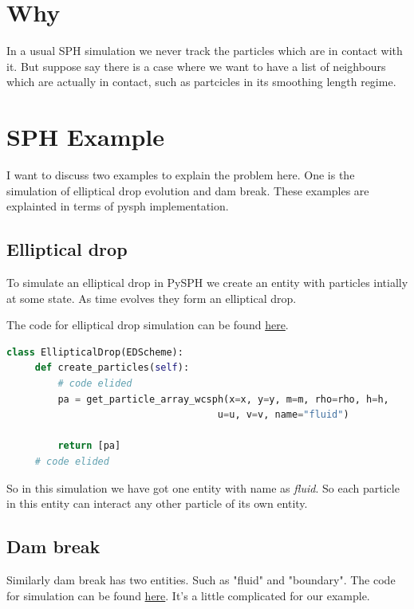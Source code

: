


\section{Why}
\label{sec-1}
In a usual SPH simulation we never track the particles which are in contact
with it.  But suppose say there is a case where we want to have a list of
neighbours which are actually in contact, such as partcicles in its smoothing
length regime.


\section{SPH Example}
\label{sec-2}
I want to discuss two examples to explain the problem here. One is the
simulation of elliptical drop evolution and dam break. These
examples are explainted in terms of pysph implementation.


\subsection{Elliptical drop}
\label{sec-2-1}
To simulate an elliptical drop in PySPH we create an entity with particles
intially at some state. As time evolves they form an elliptical drop.

The code for elliptical drop simulation can be found \href{https://github.com/pypr/pysph/blob/master/pysph/examples/elliptical_drop_no_scheme.py}{here}.

\begin{lstlisting}[language=Python]
 class EllipticalDrop(EDScheme):
     def create_particles(self):
         # code elided
         pa = get_particle_array_wcsph(x=x, y=y, m=m, rho=rho, h=h,
                                     u=u, v=v, name="fluid")

         return [pa]
     # code elided
\end{lstlisting}

So in this simulation we have got one entity with name as \emph{fluid}. So each particle
in this entity can interact any other particle of its own entity.

\subsection{Dam break}
\label{sec-2-2}
Similarly dam break has two entities. Such as "fluid" and "boundary". The
code for simulation can be found \href{https://github.com/pypr/pysph/blob/master/pysph/examples/dam_break_2d.py}{here}. It's a little complicated for our
example.


